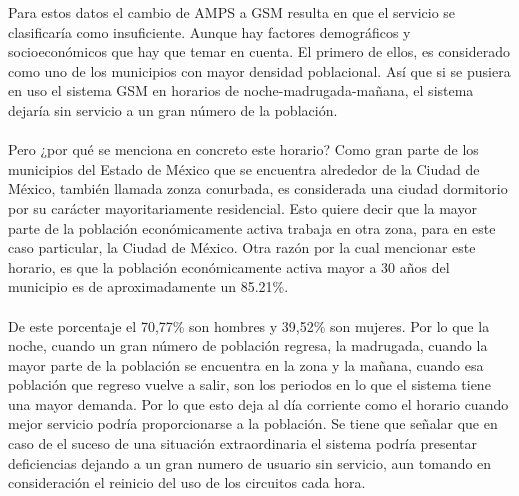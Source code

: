 \documentclass[11pt,letterpaper]{article}
\begin{document}
Para estos datos el cambio de AMPS a GSM resulta en que el servicio se clasificaría como 
insuficiente. Aunque hay factores demográficos y socioeconómicos que hay que temar en 
cuenta. El primero de ellos, es considerado como uno de los municipios con mayor densidad 
poblacional. Así que si se pusiera en uso el sistema GSM en horarios de noche-madrugada-mañana, 
el sistema dejaría sin servicio a un gran número de la población. 
\\ \\
Pero ¿por qué se menciona 
en concreto este horario? Como gran parte de los municipios del Estado de México que se 
encuentra alrededor de la Ciudad de México, también llamada zonza conurbada, es considerada 
una ciudad dormitorio por su carácter mayoritariamente residencial. Esto quiere decir que 
la mayor parte de la población económicamente activa trabaja en otra zona, para en este caso 
particular, la Ciudad de México. Otra razón por la cual mencionar este horario, es que la 
población económicamente activa mayor a 30 años del municipio es de aproximadamente un 85.21\%. 
\\ \\
De este porcentaje el 70,77\% son hombres y 39,52\% son mujeres. Por lo que la noche, cuando 
un gran número de población regresa, la madrugada, cuando la mayor parte de la población se 
encuentra en la zona y la mañana, cuando esa población que regreso vuelve a salir, son los 
periodos en lo que el sistema tiene una mayor demanda. Por lo que esto deja al día corriente 
como el horario cuando mejor servicio podría proporcionarse a la población. Se tiene que 
señalar que en caso de el suceso de una situación extraordinaria el sistema podría presentar 
deficiencias dejando a un gran numero de usuario sin servicio, aun tomando en consideración 
el reinicio del uso de los circuitos cada hora.
\end{document}
